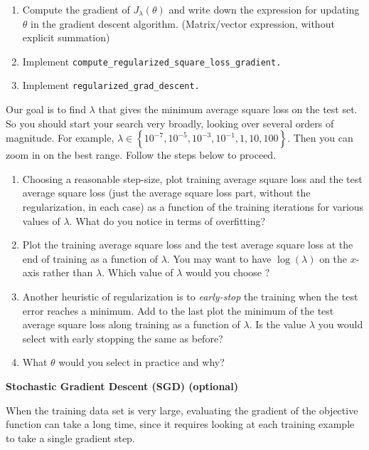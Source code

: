 \documentclass{article}
\newcommand{\nyuparagrah}[1]{\textcolor{nyupurple}{\large #1}}
\begin{document}
\begin{enumerate}
\setcounter{enumi}{\value{saveenum}}
\item Compute the gradient of $J_\lambda(\theta)$ and write down the expression
for updating $\theta$ in the gradient descent algorithm. (Matrix/vector
expression, without explicit summation)
\item Implement \texttt{compute\_regularized\_square\_loss\_gradient.}
\item Implement \texttt{regularized\_grad\_descent.}
\setcounter{saveenum}{\value{enumi}}
\end{enumerate}

Our goal is to find $\lambda$
that gives the minimum average square loss on the test set. So you should start your search very broadly, looking
over several orders of magnitude. For example, $\lambda\in\left\{ 10^{-7},10^{-5},10^{-3},10^{-1},1,10,100\right\} $.
Then you can zoom in on the best range. Follow the steps below to proceed.
\begin{enumerate}
\setcounter{enumi}{\value{saveenum}}
\item 
Choosing a reasonable step-size, plot training average square loss and
the test average square loss (just the average square loss part, without the regularization, in each case) as a function of the training iterations for various values of $\lambda$. What do you notice in terms of overfitting?


\item Plot the training average square loss and
the test average square loss at the end of training as a function of $\lambda$. You may
want to have $\log(\lambda)$ on the $x$-axis rather than $\lambda$.
Which value of $\lambda$ would you choose ?  

\item Another heuristic of regularization is to \emph{early-stop} the training when the test error reaches a minimum. Add to the last plot the minimum of the test average square loss along training as a function of $\lambda$.
Is the value $\lambda$ you would select with early stopping the same as before? 


\item What $\theta$ would you select in practice and why?
\setcounter{saveenum}{\value{enumi}}
\end{enumerate}

\vspace{0.3cm}
\nyuparagrah{\bf Stochastic Gradient Descent (SGD) (optional)}

When the training data set is very large, evaluating the
gradient of the objective function can take a long time, since it
requires looking at each training example to take a single gradient
step. 
\end{document}
